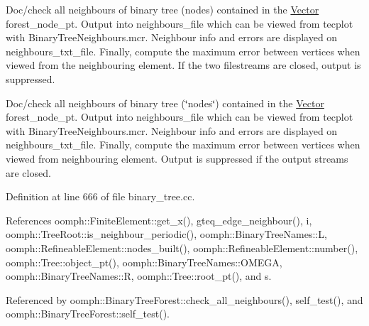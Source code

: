 Doc/check all neighbours of binary tree (nodes) contained in the \hyperlink{classoomph_1_1Vector}{Vector} forest\+\_\+node\+\_\+pt. Output into neighbours\+\_\+file which can be viewed from tecplot with Binary\+Tree\+Neighbours.\+mcr. Neighbour info and errors are displayed on neighbours\+\_\+txt\+\_\+file. Finally, compute the maximum error between vertices when viewed from the neighbouring element. If the two filestreams are closed, output is suppressed. 

Doc/check all neighbours of binary tree (\char`\"{}nodes\char`\"{}) contained in the \hyperlink{classoomph_1_1Vector}{Vector} forest\+\_\+node\+\_\+pt. Output into neighbours\+\_\+file which can be viewed from tecplot with Binary\+Tree\+Neighbours.\+mcr. Neighbour info and errors are displayed on neighbours\+\_\+txt\+\_\+file. Finally, compute the maximum error between vertices when viewed from neighbouring element. Output is suppressed if the output streams are closed. 

Definition at line 666 of file binary\+\_\+tree.\+cc.



References oomph\+::\+Finite\+Element\+::get\+\_\+x(), gteq\+\_\+edge\+\_\+neighbour(), i, oomph\+::\+Tree\+Root\+::is\+\_\+neighbour\+\_\+periodic(), oomph\+::\+Binary\+Tree\+Names\+::L, oomph\+::\+Refineable\+Element\+::nodes\+\_\+built(), oomph\+::\+Refineable\+Element\+::number(), oomph\+::\+Tree\+::object\+\_\+pt(), oomph\+::\+Binary\+Tree\+Names\+::\+O\+M\+E\+GA, oomph\+::\+Binary\+Tree\+Names\+::R, oomph\+::\+Tree\+::root\+\_\+pt(), and s.



Referenced by oomph\+::\+Binary\+Tree\+Forest\+::check\+\_\+all\+\_\+neighbours(), self\+\_\+test(), and oomph\+::\+Binary\+Tree\+Forest\+::self\+\_\+test().

\mbox{\label{classoomph_1_1BinaryTree_aba768160bad3531d0f62033788619f56}} 
